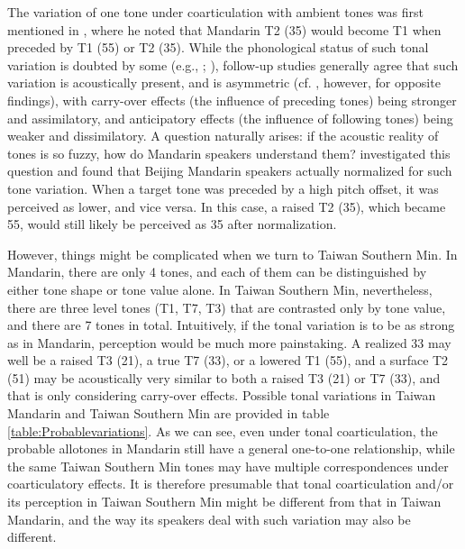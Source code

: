 \documentclass[12pt]{report}
\begin{document}
\begin{CJK}{UTF8}{bsmi}

The variation of one tone under coarticulation with ambient tones was first mentioned in \cite{Chao1968}, where he noted that Mandarin T2 (35) would become T1 when preceded by T1 (55) or T2 (35). While the phonological status of such tonal variation is doubted by some (e.g., \citealp{ShihSproat1992}; \citealp{Xu1994}), follow-up studies generally agree that such variation is acoustically present, and is asymmetric (cf. \citealp{Shen1990}, however, for opposite findings), with carry-over effects (the influence of preceding tones) being stronger and assimilatory, and anticipatory effects (the influence of following tones) being weaker and dissimilatory. A question naturally arises: if the acoustic reality of tones is so fuzzy, how do Mandarin speakers understand them? \cite{Xu1997} investigated this question and found that Beijing Mandarin speakers actually normalized for such tone variation. When a target tone was preceded by a high pitch offset, it was perceived as lower, and vice versa. In this case, a raised T2 (35), which became 55, would still likely be perceived as 35 after normalization.

However, things might be complicated when we turn to Taiwan Southern Min. In Mandarin, there are only 4 tones, and each of them can be distinguished by either tone shape or tone value alone. In Taiwan Southern Min, nevertheless, there are three level tones (T1, T7, T3) that are contrasted only by tone value, and there are 7 tones in total. Intuitively, if the tonal variation is to be as strong as in Mandarin, perception would be much more painstaking. A realized 33 may well be a raised T3 (21), a true T7 (33), or a lowered T1 (55), and a surface T2 (51) may be acoustically very similar to both a raised T3 (21) or T7 (33), and that is only considering carry-over effects. Possible tonal variations in Taiwan Mandarin and Taiwan Southern Min are provided in table \ref{table:Probablevariations}. As we can see, even under tonal coarticulation, the probable allotones in Mandarin still have a general one-to-one relationship, while the same Taiwan Southern Min tones may have multiple correspondences under coarticulatory effects. It is therefore presumable that tonal coarticulation and/or its perception in Taiwan Southern Min might be different from that in Taiwan Mandarin, and the way its speakers deal with such variation may also be different.


\end{CJK}
\end{document}
